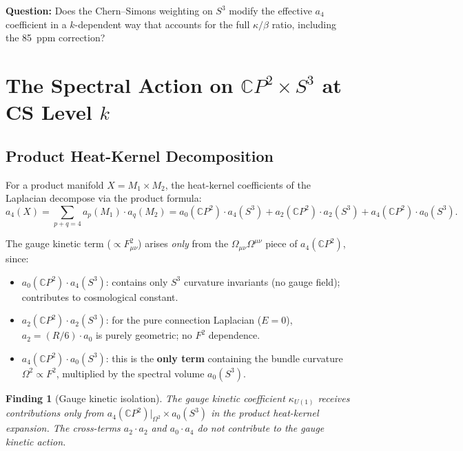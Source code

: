 \documentclass[12pt,a4paper]{article}
\newtheorem{finding}{Finding}
\theoremstyle{definition}
\theoremstyle{remark}
\begin{document}
\textbf{Question:} Does the Chern--Simons weighting on $S^3$ modify the
effective $a_4$ coefficient in a $k$-dependent way that accounts for the
full $\kappa/\beta$ ratio, including the 85~ppm correction?

\section{The Spectral Action on $\mathbb{C}P^2 \times S^3$ at CS Level $k$}
\label{sec:spectral-action-k}

\subsection{Product Heat-Kernel Decomposition}

For a product manifold $X = M_1 \times M_2$, the heat-kernel coefficients
of the Laplacian decompose via the product formula:
\begin{equation}\label{eq:product-formula}
a_4(X) = \sum_{p+q=4} a_p(M_1) \cdot a_q(M_2)
= a_0(\mathbb{C}P^2) \cdot a_4(S^3)
+ a_2(\mathbb{C}P^2) \cdot a_2(S^3)
+ a_4(\mathbb{C}P^2) \cdot a_0(S^3).
\end{equation}

The gauge kinetic term ($\propto F_{\mu\nu}^2$) arises \emph{only} from the
$\Omega_{\mu\nu}\Omega^{\mu\nu}$ piece of $a_4(\mathbb{C}P^2)$, since:
\begin{itemize}
\item $a_0(\mathbb{C}P^2) \cdot a_4(S^3)$: contains only $S^3$ curvature
  invariants (no gauge field); contributes to cosmological constant.
\item $a_2(\mathbb{C}P^2) \cdot a_2(S^3)$: for the pure connection Laplacian
  ($E = 0$), $a_2 = (R/6) \cdot a_0$ is purely geometric; no $F^2$ dependence.
\item $a_4(\mathbb{C}P^2) \cdot a_0(S^3)$: this is the \textbf{only term}
  containing the bundle curvature $\Omega^2 \propto F^2$, multiplied by
  the spectral volume $a_0(S^3)$.
\end{itemize}

\begin{finding}[Gauge kinetic isolation]
The gauge kinetic coefficient $\kappa_{U(1)}$ receives contributions
only from $a_4(\mathbb{C}P^2)\big|_{\Omega^2} \times a_0(S^3)$ in the
product heat-kernel expansion.  The cross-terms $a_2 \cdot a_2$ and
$a_0 \cdot a_4$ do not contribute to the gauge kinetic action.
\end{finding}
\end{document}
